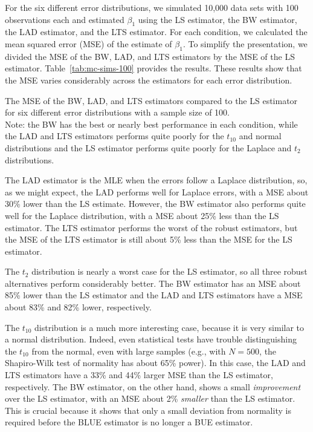 \documentclass[12pt]{article}
\begin{document}
For the six different error distributions, we simulated 10,000 data sets with 100 observations each and estimated $\beta_1$ using the LS estimator, the BW estimator, the LAD estimator, and the LTS estimator. 
For each condition, we calculated the mean squared error (MSE) of the estimate of $\beta_1$. 
To simplify the presentation, we divided the MSE of the BW, LAD, and LTS estimators by the MSE of the LS estimator. 
Table~\ref{tab:mc-sims-100} provides the results. 
These results show that the MSE varies considerably across the estimators for each error distribution.

\begin{table}[h!]
{\scriptsize

}
\caption{The MSE of the BW, LAD, and LTS estimators compared to the LS estimator for six different error distributions with a sample size of 100. \\
Note: the BW has the best or nearly best performance in each condition, while the LAD and LTS estimators performs quite poorly for the $t_{10}$ and normal distributions and the LS estimator performs quite poorly for the Laplace and $t_2$ distributions.}\label{tab:mc-sims-100}
\end{table}

The LAD estimator is the MLE when the errors follow a Laplace distribution, so, as we might expect, the LAD performs well for Laplace errors, with a MSE about 30\% lower than the LS estimate. 
However, the BW estimator also performs quite well for the Laplace distribution, with a MSE about 25\% less than the LS estimator. The LTS estimator performs the worst of the robust estimators, but the MSE of the LTS estimator is still about 5\% less than the MSE for the LS estimator.

The $t_2$ distribution is nearly a worst case for the LS estimator, so all three robust alternatives perform considerably better. 
The BW estimator has an MSE about 85\% lower than the LS estimator and the LAD and LTS estimators have a MSE about 83\% and 82\% lower, respectively. 

The $t_{10}$ distribution is a much more interesting case, because it is very similar to a normal distribution. 
Indeed, even statistical tests have trouble distinguishing the $t_{10}$ from the normal, even with large samples (e.g., with $N = 500$, the Shapiro-Wilk test of normality has about 65\% power). 
In this case, the LAD and LTS estimators have a 33\% and 44\% larger MSE than the LS estimator, respectively.
The BW estimator, on the other hand, shows a small \textit{improvement} over the LS estimator, with an MSE about 2\% \textit{smaller} than the LS estimator. 
This is crucial because it shows that only a small deviation from normality is required before the BLUE estimator is no longer a BUE estimator. 
\end{document}
